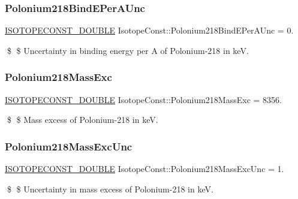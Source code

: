 \subsubsection{\texorpdfstring{Polonium218\+Bind\+E\+Per\+A\+Unc}{Polonium218BindEPerAUnc}}
{\footnotesize\ttfamily \mbox{\hyperlink{group___isotope_const-_macros_ga8f45a7272ce02c0b4c65c44636ed719a}{I\+S\+O\+T\+O\+P\+E\+C\+O\+N\+S\+T\+\_\+\+D\+O\+U\+B\+LE}} Isotope\+Const\+::\+Polonium218\+Bind\+E\+Per\+A\+Unc = 0.}

\$ \$ Uncertainty in binding energy per A of Polonium-\/218 in keV. \mbox{\label{group___isotope_const-_polonium-_po218_ga49eefa84f520649933f3097936bb9a51}} 
\subsubsection{\texorpdfstring{Polonium218\+Mass\+Exc}{Polonium218MassExc}}
{\footnotesize\ttfamily \mbox{\hyperlink{group___isotope_const-_macros_ga8f45a7272ce02c0b4c65c44636ed719a}{I\+S\+O\+T\+O\+P\+E\+C\+O\+N\+S\+T\+\_\+\+D\+O\+U\+B\+LE}} Isotope\+Const\+::\+Polonium218\+Mass\+Exc = 8356.}

\$ \$ Mass excess of Polonium-\/218 in keV. \mbox{\label{group___isotope_const-_polonium-_po218_gaffc1e7072bc570f4047bbef14400ab56}} 
\subsubsection{\texorpdfstring{Polonium218\+Mass\+Exc\+Unc}{Polonium218MassExcUnc}}
{\footnotesize\ttfamily \mbox{\hyperlink{group___isotope_const-_macros_ga8f45a7272ce02c0b4c65c44636ed719a}{I\+S\+O\+T\+O\+P\+E\+C\+O\+N\+S\+T\+\_\+\+D\+O\+U\+B\+LE}} Isotope\+Const\+::\+Polonium218\+Mass\+Exc\+Unc = 1.}

\$ \$ Uncertainty in mass excess of Polonium-\/218 in keV. \mbox{\label{group___isotope_const-_polonium-_po218_ga6cf52eb86a343683831b6c700f80f3d0}} 
